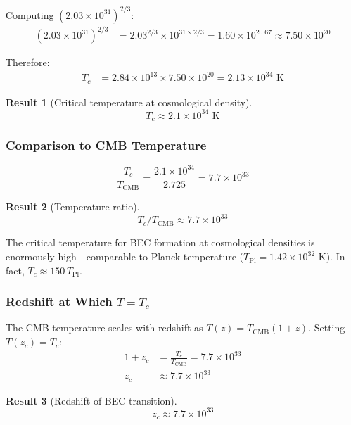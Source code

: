 \documentclass[11pt,a4paper]{article}
\newcommand{\ee}[1]{\times 10^{#1}}
\newtheorem{result}{Result}
\begin{document}
Computing $(2.03 \ee{31})^{2/3}$:
\begin{align}
(2.03 \ee{31})^{2/3} &= 2.03^{2/3} \times 10^{31 \times 2/3} = 1.60 \times 10^{20.67} \approx 7.50 \ee{20}
\end{align}

Therefore:
\begin{align}
T_c &= 2.84 \ee{13} \times 7.50 \ee{20} = 2.13 \ee{34} \text{ K}
\end{align}

\begin{result}[Critical temperature at cosmological density]
\begin{equation}
\boxed{T_c \approx 2.1 \times 10^{34} \text{ K}}
\end{equation}
\end{result}

\subsubsection{Comparison to CMB Temperature}

\begin{equation}
\frac{T_c}{T_{\mathrm{CMB}}} = \frac{2.1 \ee{34}}{2.725} = 7.7 \ee{33}
\end{equation}

\begin{result}[Temperature ratio]
\begin{equation}
\boxed{T_c / T_{\mathrm{CMB}} \approx 7.7 \times 10^{33}}
\end{equation}
\end{result}

The critical temperature for BEC formation at cosmological densities is enormously high---comparable to Planck temperature ($T_{\mathrm{Pl}} = 1.42 \ee{32}$ K). In fact, $T_c \approx 150 \, T_{\mathrm{Pl}}$.

\subsubsection{Redshift at Which $T = T_c$}

The CMB temperature scales with redshift as $T(z) = T_{\mathrm{CMB}} (1+z)$. Setting $T(z_c) = T_c$:
\begin{align}
1 + z_c &= \frac{T_c}{T_{\mathrm{CMB}}} = 7.7 \ee{33} \\
z_c &\approx 7.7 \ee{33}
\end{align}

\begin{result}[Redshift of BEC transition]
\begin{equation}
\boxed{z_c \approx 7.7 \times 10^{33}}
\end{equation}
\end{result}
\end{document}

